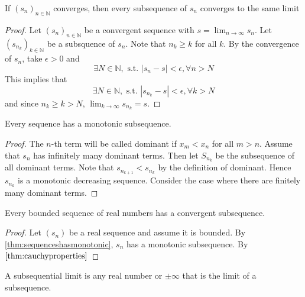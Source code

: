 \documentclass[../notes.tex]{subfiles}
\begin{document}
\begin{theorem}
    If $(s_n)_{n\in \mathbb{N}}$ converges, then every subsequence of $s_n$ converges to the same limit
\end{theorem}

\begin{proof}
    Let $(s_n)_{n \in \mathbb{N}}$ be a convergent sequence with $s = \lim_{n \to \infty} s_n$. Let $(s_{n_k})_{k\in \mathbb{N}}$ be a subsquence of $s_n$. Note that $n_k \geq k$ for all $k$. By the convergence of $s_n$, take $\epsilon > 0$ and
    \[
        \exists N \in \mathbb{N}, \text{ s.t. } |s_n - s| < \epsilon, \forall n > N
    \]
    This implies that
    \[
        \exists N \in \mathbb{N}, \text{ s.t. } |s_{n_k} - s| < \epsilon, \forall k > N
    \]
    and since $n_k \geq k > N$, $\lim_{k \to \infty} s_{n_k} = s$.
\end{proof}

\begin{theorem}
    \label{thm:sequenceshasmonotonic}
    Every sequence has a monotonic subsequence.
\end{theorem}
\begin{proof}
    The $n$-th term will be called dominant if $x_m < x_n$ for all $m > n$. Assume that $s_n$ has infinitely many dominant terms. Then let $S_{n_k}$ be the subsequence of all dominant terms. Note that $s_{n_{k+1}} < s_{n_k}$ by the definition of dominant. Hence $s_{n_k}$ is a monotonic decreasing sequence. Consider the case where there are finitely many dominant terms.
\end{proof}

\begin{theorem}
    \label{thm:bolzanoweistrass}
    Every bounded sequence of real numbers has a convergent subsequence.
\end{theorem}
\begin{proof}
    Let $(s_n)$ be a real sequence and assume it is bounded. By \ref{thm:sequenceshasmonotonic}, $s_n$ has a monotonic subsequence. By $\ref{thm:cauchyproperties}$
\end{proof}

\begin{definition}
    A subsequential limit is any real number or $\pm \infty$ that is the limit of a subsequence.
\end{definition}
\end{document}
